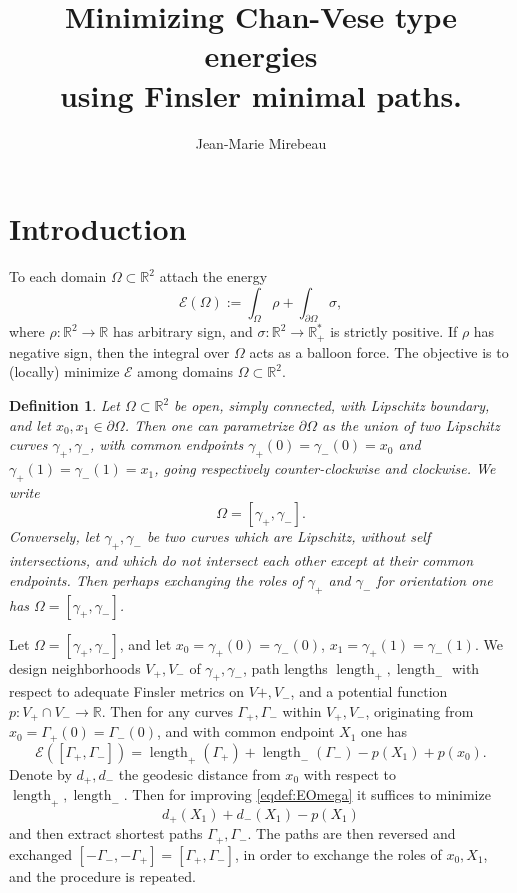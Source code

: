 \documentclass[11pt]{article}
\author{
Jean-Marie Mirebeau
}
\newtheorem{definition}{Definition}
\def\mR{{\mathbb R}}
\def\cE{{\mathcal E}}
\DeclareMathOperator\length{length}
\begin{document}
\title{
Minimizing Chan-Vese type energies\\ using Finsler minimal paths.
}
\maketitle
\date{}

\section{Introduction}

To each domain $\Omega\subset \mR^2$ attach the energy
\begin{equation}
\label{eqdef:EOmega}
	\cE(\Omega) := \int_\Omega \rho+\int_{\partial \Omega} \sigma,
\end{equation}
where $\rho : \mR^2 \to \mR$ has arbitrary sign, and $\sigma : \mR^2 \to \mR_+^*$ is strictly positive. If $\rho$ has negative sign, then the integral over $\Omega$ acts as a balloon force.
The objective is to (locally) minimize $\cE$ among domains $\Omega \subset \mR^2$.

\begin{definition}
	Let $\Omega\subset \mR^2$ be open, simply connected, with Lipschitz boundary, and let $x_0,x_1 \in \partial \Omega$. Then one can parametrize $\partial \Omega$ as the union of two Lipschitz curves $\gamma_+,\gamma_-$, with common endpoints $\gamma_+(0)=\gamma_-(0)=x_0$ and $\gamma_+(1)=\gamma_-(1)=x_1$, going respectively counter-clockwise and clockwise.
	We write
	\begin{equation*}
		\Omega = [\gamma_+, \gamma_-].
	\end{equation*}
	Conversely, let $\gamma_+,\gamma_-$ be two curves which are Lipschitz, without  self intersections, and which do not intersect each other except at their common endpoints. Then perhaps exchanging the roles of $\gamma_+$ and $\gamma_-$ for orientation one has $\Omega = [\gamma_+, \gamma_-]$.
	\end{definition}


Let $\Omega = [\gamma_+, \gamma_-]$, and let $x_0=\gamma_+(0)=\gamma_-(0)$, $x_1=\gamma_+(1) = \gamma_-(1)$.
We design neighborhoods $V_+, V_-$ of $\gamma_+, \gamma_-$, path lengths $\length_+, \length_-$ with respect to adequate Finsler metrics on $V+,V_-$, and a potential function $p : V_+\cap V_- \to \mR$.
Then for any curves $\Gamma_+, \Gamma_-$ within $V_+,V_-$, originating from $x_0=\Gamma_+(0)=\Gamma_-(0)$, and with common endpoint $X_1$ one has 
\begin{equation*}
	\cE([\Gamma_+, \Gamma_-]) = \length_+(\Gamma_+) + \length_-(\Gamma_-) - p(X_1)+p(x_0).
\end{equation*}
Denote by $d_+, d_-$ the geodesic distance from $x_0$ with respect to $\length_+, \length_-$. Then for improving \eqref{eqdef:EOmega} it suffices to minimize
\begin{equation*}
	d_+(X_1)+d_-(X_1) - p(X_1)
\end{equation*}
and then extract shortest paths $\Gamma_+, \Gamma_-$. The paths are then reversed and exchanged $[-\Gamma_-, -\Gamma_+] = [\Gamma_+, \Gamma_-]$, in order to exchange the roles of $x_0,X_1$, and the procedure is repeated.
\end{document}
